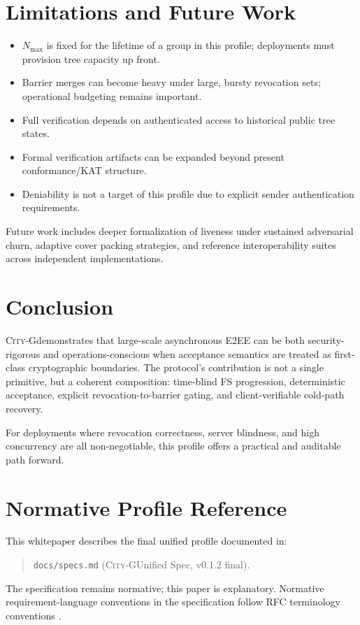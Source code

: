 \documentclass[11pt]{article}
\newcommand{\cityg}{\textsc{City-G}}
\begin{document}
\section{Limitations and Future Work}
\begin{itemize}
  \item \(N_{\max}\) is fixed for the lifetime of a group in this profile; deployments must provision tree capacity up front.
  \item Barrier merges can become heavy under large, bursty revocation sets; operational budgeting remains important.
  \item Full verification depends on authenticated access to historical public tree states.
  \item Formal verification artifacts can be expanded beyond present conformance/KAT structure.
  \item Deniability is not a target of this profile due to explicit sender authentication requirements.
\end{itemize}

Future work includes deeper formalization of liveness under sustained adversarial churn, adaptive cover packing strategies, and reference interoperability suites across independent implementations.

\section{Conclusion}
\cityg demonstrates that large-scale asynchronous E2EE can be both security-rigorous and operations-conscious when acceptance semantics are treated as first-class cryptographic boundaries. The protocol's contribution is not a single primitive, but a coherent composition: time-blind FS progression, deterministic acceptance, explicit revocation-to-barrier gating, and client-verifiable cold-path recovery.

For deployments where revocation correctness, server blindness, and high concurrency are all non-negotiable, this profile offers a practical and auditable path forward.

\appendix
\section{Normative Profile Reference}
This whitepaper describes the final unified profile documented in:
\begin{quote}
\texttt{docs/specs.md} (\cityg Unified Spec, v0.1.2 final).
\end{quote}
The specification remains normative; this paper is explanatory.
Normative requirement-language conventions in the specification follow RFC terminology conventions \citep{rfc2119,rfc8174}.
\end{document}
